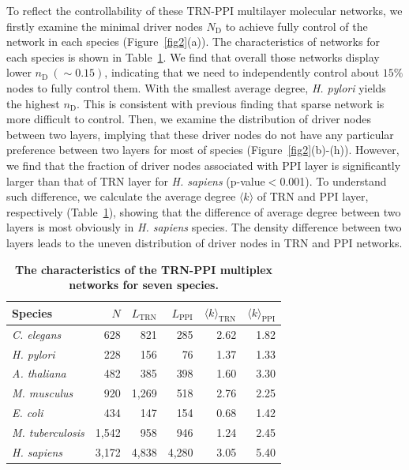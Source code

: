 \documentclass[%
 reprint,
 amsmath,amssymb,
 aps,
]{revtex4-2}
\begin{document}
To reflect the controllability of these TRN-PPI multilayer molecular networks, we firstly examine the minimal driver nodes $N_\text{D}$ to achieve fully control of the network in each species (Figure~\ref{fig2}(a)). The characteristics of networks for each species is shown in Table~\ref{tab1}. We find that overall those networks display lower $n_\text{D}\ (\sim0.15)$, indicating that we need to independently control about $15\%$ nodes to fully control them. With the smallest average degree, \emph{H. pylori} yields the highest $n_\text{D}$. This is consistent with previous finding that sparse network is more difficult to control. Then, we examine the distribution of driver nodes between two layers, implying that these driver nodes do not have any particular preference between two layers for most of species (Figure~\ref{fig2}(b)-(h)). However, we find that the fraction of driver nodes associated with PPI layer is significantly larger than that of TRN layer for \emph{H. sapiens} (p-value$<$0.001). To understand such difference, we calculate the average degree $\langle k \rangle$ of TRN and PPI layer, respectively (Table~\ref{tab1}), showing that the difference of average degree between two layers is most obviously in \emph{H. sapiens} species. The density difference between two layers leads to the uneven distribution of driver nodes in TRN and PPI networks.
   
\begin{table}[h]
\caption{\label{tab1} \textbf{The characteristics of the TRN-PPI multiplex networks for seven species.}}
\begin{ruledtabular}
\begin{tabular}{lrrrrr}
Species  & $N$ & $L_\text{TRN}$ & $L_\text{PPI}$ & $\langle k \rangle_\text{TRN}$ & $\langle k \rangle_\text{PPI}$\\
\hline
\it{C. elegans} & 628 & 821 & 285 & 2.62& 1.82\\
\it{H. pylori}  & 228 & 156 & 76 & 1.37 & 1.33\\
\it{A. thaliana} & 482 & 385 & 398 & 1.60 & 3.30\\
\it{M. musculus} & 920 & 1,269 & 518 & 2.76 & 2.25\\
\it{E. coli} & 434 & 147 & 154 & 0.68 & 1.42\\
\it{M. tuberculosis} & 1,542 & 958 & 946 & 1.24 & 2.45\\
\it{H. sapiens} & 3,172 & 4,838 & 4,280 & 3.05 & 5.40
\end{tabular}
\end{ruledtabular}
\end{table}
\end{document}
